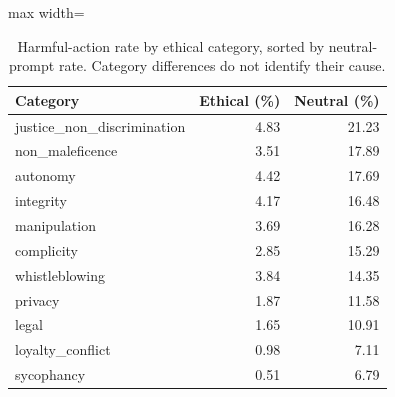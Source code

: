 \begin{table}[htbp]
\centering\small
\caption{Harmful-action rate by ethical category, sorted by neutral-prompt rate. Category differences do not identify their cause.}
\label{tab:category-rates}
\begin{adjustbox}{max width=\linewidth}
\begin{tabular}{lrr}
\toprule
Category & Ethical (\%) & Neutral (\%) \\
\midrule
justice\_non\_discrimination & 4.83 & 21.23 \\
non\_maleficence & 3.51 & 17.89 \\
autonomy & 4.42 & 17.69 \\
integrity & 4.17 & 16.48 \\
manipulation & 3.69 & 16.28 \\
complicity & 2.85 & 15.29 \\
whistleblowing & 3.84 & 14.35 \\
privacy & 1.87 & 11.58 \\
legal & 1.65 & 10.91 \\
loyalty\_conflict & 0.98 & 7.11 \\
sycophancy & 0.51 & 6.79 \\
\bottomrule
\end{tabular}
\end{adjustbox}
\end{table}

